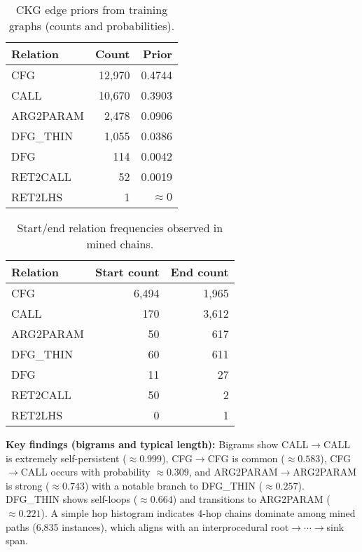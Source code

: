 \documentclass{buthesis}
\begin{document}
\begin{table}[H]
\centering
\caption{CKG edge priors from training graphs (counts and probabilities).}
\label{tab:ckg-edge-priors}
\begin{tabular}{lrr}
\toprule
\textbf{Relation} & \textbf{Count} & \textbf{Prior} \\
\midrule
\textsc{CFG}        & 12{,}970 & 0.4744 \\
\textsc{CALL}       & 10{,}670 & 0.3903 \\
\textsc{ARG2PARAM}  & 2{,}478  & 0.0906 \\
\textsc{DFG\_THIN}  & 1{,}055  & 0.0386 \\
\textsc{DFG}        & 114      & 0.0042 \\
\textsc{RET2CALL}   & 52       & 0.0019 \\
\textsc{RET2LHS}    & 1        & $\approx 0$ \\
\bottomrule
\end{tabular}
\end{table}

\begin{table}[H]
\centering
\caption{Start/end relation frequencies observed in mined chains.}
\label{tab:ckg-start-end}
\begin{tabular}{lrr}
\toprule
\textbf{Relation} & \textbf{Start count} & \textbf{End count} \\
\midrule
\textsc{CFG}        & 6{,}494 & 1{,}965 \\
\textsc{CALL}       & 170     & 3{,}612 \\
\textsc{ARG2PARAM}  & 50      & 617 \\
\textsc{DFG\_THIN}  & 60      & 611 \\
\textsc{DFG}        & 11      & 27 \\
\textsc{RET2CALL}   & 50      & 2 \\
\textsc{RET2LHS}    & 0       & 1 \\
\bottomrule
\end{tabular}
\end{table}

\textbf{Key findings (bigrams and typical length):}
Bigrams show \textsc{CALL}$\!\to$\textsc{CALL} is extremely self-persistent ($\approx 0.999$), \textsc{CFG}$\!\to$\textsc{CFG} is common ($\approx 0.583$), \textsc{CFG}$\!\to$\textsc{CALL} occurs with probability $\approx 0.309$, and \textsc{ARG2PARAM}$\!\to$\textsc{ARG2PARAM} is strong ($\approx 0.743$) with a notable branch to \textsc{DFG\_THIN} ($\approx 0.257$). \textsc{DFG\_THIN} shows self-loops ($\approx 0.664$) and transitions to \textsc{ARG2PARAM} ($\approx 0.221$). A simple hop histogram indicates 4-hop chains dominate among mined paths (6{,}835 instances), which aligns with an interprocedural root$\rightarrow\cdots\rightarrow$sink span.
\end{document}
